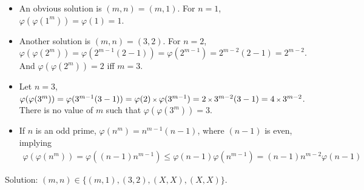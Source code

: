 \begin{itemize}[label={-}]
\item An obvious solution is $(m,n)=(m,1)$. For $n=1$, $\varphi(\varphi(1^{m}))=\varphi(1)=1$. 

\item Another solution is $(m,n)=(3,2)$.
For $n=2$, $\varphi(\varphi(2^{m}))=\varphi(2^{m-1}(2-1))=\varphi(2^{m-1})=2^{m-2}(2-1)=2^{m-2}$. And $\varphi(\varphi(2^{m}))=2$ iff $m=3$. 

\item Let $n=3$, $\varphi(\varphi(3^{m}))=\varphi(3^{m-1}(3-1))=\varphi(2) \operatorname{\mbox{\scriptsize$\times$}} \varphi(3^{m-1})=2 \operatorname{\mbox{\scriptsize$\times$}} 3^{m-2}(3-1)=4 \operatorname{\mbox{\scriptsize$\times$}} 3^{m-2}$. There is no value of $m$ such that $\varphi(\varphi(3^{m}))=3$. 

\item If $n$ is an odd prime, $\varphi(n^{m})=n^{m-1}(n-1)$, where $(n-1)$ is even, implying
\begin{align*}
\varphi(\varphi(n^{m})) = \varphi((n-1)n^{m-1})
\le \varphi(n-1) \varphi(n^{m-1})
= (n-1) n^{m-2} \varphi(n-1)
\end{align*}
\end{itemize}

Solution: $(m,n) \in \{ (m,1), (3,2), (X,X), (X,X) \}$. 